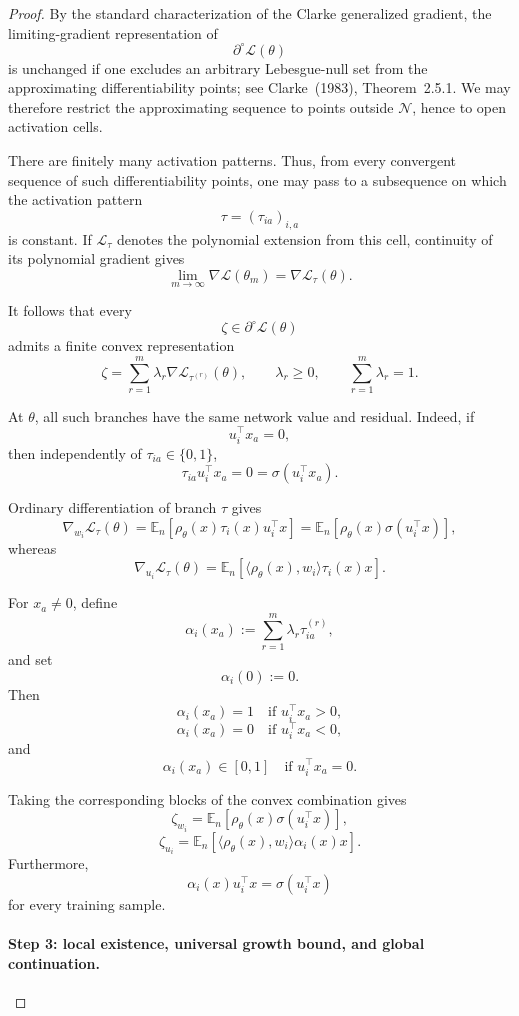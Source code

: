 \documentclass{article} %
\theoremstyle{plain}
\theoremstyle{definition}
\theoremstyle{remark}
\begin{document}
\begin{proof}
By the standard characterization of the Clarke generalized gradient, the
limiting-gradient representation of
\[
\partial^\circ\mathcal L(\theta)
\]
is unchanged if one excludes an arbitrary Lebesgue-null set from the
approximating differentiability points; see Clarke~(1983),
Theorem~2.5.1. We may therefore restrict the approximating sequence to
points outside $\mathcal N$, hence to open activation cells.

There are finitely many activation patterns. Thus, from every convergent
sequence of such differentiability points, one may pass to a subsequence on
which the activation pattern
\[
\tau=(\tau_{ia})_{i,a}
\]
is constant. If $\mathcal L_\tau$ denotes the polynomial extension from this
cell, continuity of its polynomial gradient gives
\[
\lim_{m\to\infty}
\nabla\mathcal L(\theta_m)
=
\nabla\mathcal L_\tau(\theta).
\]

It follows that every
\[
\zeta\in\partial^\circ\mathcal L(\theta)
\]
admits a finite convex representation
\[
\zeta
=
\sum_{r=1}^m
\lambda_r
\nabla\mathcal L_{\tau^{(r)}}(\theta),
\qquad
\lambda_r\ge0,
\qquad
\sum_{r=1}^m\lambda_r=1.
\]

At $\theta$, all such branches have the same network value and residual.
Indeed, if
\[
u_i^\top x_a=0,
\]
then independently of $\tau_{ia}\in\{0,1\}$,
\[
\tau_{ia}u_i^\top x_a
=
0
=
\sigma(u_i^\top x_a).
\]

Ordinary differentiation of branch $\tau$ gives
\[
\nabla_{w_i}\mathcal L_\tau(\theta)
=
\mathbb E_n
\left[
\rho_\theta(x)
\tau_i(x)u_i^\top x
\right]
=
\mathbb E_n
\left[
\rho_\theta(x)
\sigma(u_i^\top x)
\right],
\]
whereas
\[
\nabla_{u_i}\mathcal L_\tau(\theta)
=
\mathbb E_n
\left[
\langle
\rho_\theta(x),
w_i
\rangle
\tau_i(x)x
\right].
\]

For $x_a\neq0$, define
\[
\alpha_i(x_a)
:=
\sum_{r=1}^m
\lambda_r\tau_{ia}^{(r)},
\]
and set
\[
\alpha_i(0):=0.
\]
Then
\[
\alpha_i(x_a)=1
\quad\text{if }u_i^\top x_a>0,
\]
\[
\alpha_i(x_a)=0
\quad\text{if }u_i^\top x_a<0,
\]
and
\[
\alpha_i(x_a)\in[0,1]
\quad\text{if }u_i^\top x_a=0.
\]

Taking the corresponding blocks of the convex combination gives
\[
\zeta_{w_i}
=
\mathbb E_n
\left[
\rho_\theta(x)
\sigma(u_i^\top x)
\right],
\]
\[
\zeta_{u_i}
=
\mathbb E_n
\left[
\langle
\rho_\theta(x),
w_i
\rangle
\alpha_i(x)x
\right].
\]
Furthermore,
\[
\boxed{
\alpha_i(x)u_i^\top x
=
\sigma(u_i^\top x)
}
\]
for every training sample.

\paragraph{Step 3: local existence, universal growth bound, and global
continuation.}


\end{proof}
\end{document}
